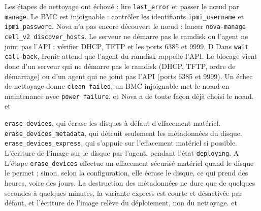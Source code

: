   {Les étapes de nettoyage ont échoué : lire \texttt{last\_error} et passer le nœud par \texttt{manage}.}
  {Le BMC est injoignable : contrôler les identifiants \texttt{ipmi\_username} et \texttt{ipmi\_password}.}
  {Nova n'a pas encore découvert le nœud : lancer \texttt{nova-manage cell\_v2 discover\_hosts}.}
  {Le serveur ne démarre pas le ramdisk ou l'agent ne joint pas l'API : vérifier DHCP, TFTP et les ports 6385 et 9999.}
  {D}
  {Dans \texttt{wait call-back}, Ironic attend que l'agent du ramdisk rappelle l'API. Le blocage vient donc d'un serveur qui ne démarre pas le ramdisk (DHCP, TFTP, ordre de démarrage) ou d'un agent qui ne joint pas l'API (ports 6385 et 9999). Un échec de nettoyage donne \texttt{clean failed}, un BMC injoignable met le nœud en maintenance avec \texttt{power failure}, et Nova a de toute façon déjà choisi le nœud.}
  { et }

  {\texttt{erase\_devices}, qui écrase les disques à défaut d'effacement matériel.}
  {\texttt{erase\_devices\_metadata}, qui détruit seulement les métadonnées du disque.}
  {\texttt{erase\_devices\_express}, qui s'appuie sur l'effacement matériel si possible.}
  {L'écriture de l'image sur le disque par l'agent, pendant l'état \texttt{deploying}.}
  {A}
  {L'étape \texttt{erase\_devices} effectue un effacement sécurisé matériel quand le disque le permet ; sinon, selon la configuration, elle écrase le disque, ce qui prend des heures, voire des jours. La destruction des métadonnées ne dure que de quelques secondes à quelques minutes, la variante express est courte et désactivée par défaut, et l'écriture de l'image relève du déploiement, non du nettoyage.}
  { et }

